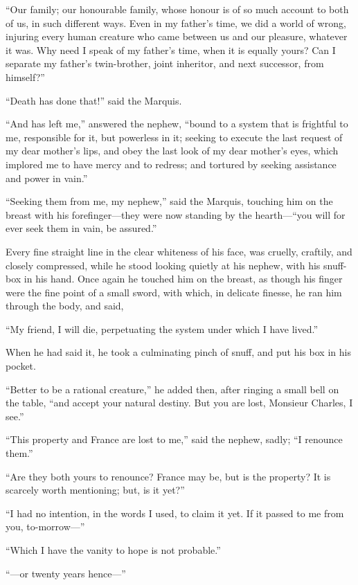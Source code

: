 ``Our family; our honourable family, whose honour is of so much
account to both of us, in such different ways.  Even in my father's
time, we did a world of wrong, injuring every human creature who came
between us and our pleasure, whatever it was.  Why need I speak of my
father's time, when it is equally yours?  Can I separate my father's
twin-brother, joint inheritor, and next successor, from himself?''

``Death has done that!'' said the Marquis.

``And has left me,'' answered the nephew, ``bound to a system that is
frightful to me, responsible for it, but powerless in it; seeking to
execute the last request of my dear mother's lips, and obey the last
look of my dear mother's eyes, which implored me to have mercy and to
redress; and tortured by seeking assistance and power in vain.''

``Seeking them from me, my nephew,'' said the Marquis, touching him on
the breast with his forefinger---they were now standing by the
hearth---``you will for ever seek them in vain, be assured.''

Every fine straight line in the clear whiteness of his face, was
cruelly, craftily, and closely compressed, while he stood looking
quietly at his nephew, with his snuff-box in his hand.  Once again he
touched him on the breast, as though his finger were the fine point
of a small sword, with which, in delicate finesse, he ran him through
the body, and said,

``My friend, I will die, perpetuating the system under which I have lived.''

When he had said it, he took a culminating pinch of snuff, and put
his box in his pocket.

``Better to be a rational creature,'' he added then, after ringing a
small bell on the table, ``and accept your natural destiny.  But you
are lost, Monsieur Charles, I see.''

``This property and France are lost to me,'' said the nephew, sadly;
``I renounce them.''

``Are they both yours to renounce?  France may be, but is the property?
It is scarcely worth mentioning; but, is it yet?''

``I had no intention, in the words I used, to claim it yet.  If it
passed to me from you, to-morrow---''

``Which I have the vanity to hope is not probable.''

``---or twenty years hence---''

